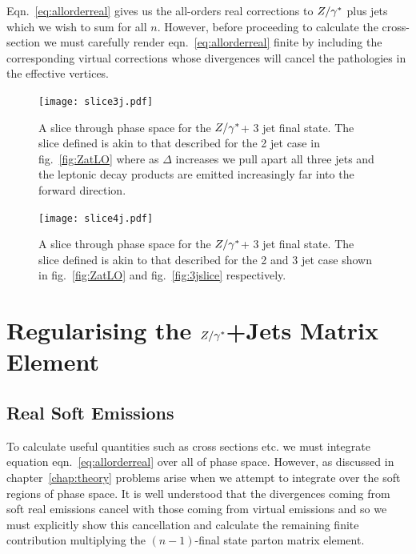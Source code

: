 		Eqn.~\eqref{eq:allorderreal} gives us the all-orders real corrections to $Z/\gamma^*$ plus jets which we wish to sum for all $n$.
		However, before proceeding to calculate the cross-section we must carefully render eqn.~\eqref{eq:allorderreal}
		finite by including the corresponding virtual corrections whose divergences will cancel the pathologies
		in the effective vertices.

		\begin{figure}[hbt]
		  \begin{center}
		    \texttt{[image: slice3j.pdf]}
		    \caption{A slice through phase space for the $Z/\gamma^*$+ 3 jet final state.  The slice defined is
		    akin to that described for the 2 jet case in fig.~\eqref{fig:ZatLO} where as $\Delta$ increases
		    we pull apart all three jets and the leptonic decay products are emitted increasingly far into
		    the forward direction.}
		    \label{fig:3jslice}
		  \end{center}
		\end{figure}

		\begin{figure}[hbt]
		  \begin{center}
		    \texttt{[image: slice4j.pdf]}
		    \caption{A slice through phase space for the $Z/\gamma^*$+ 3 jet final state.  The slice defined is
		    akin to that described for the 2 and 3 jet case shown in fig.~\eqref{fig:ZatLO} and
		    fig.~\eqref{fig:3jslice} respectively.}
		    \label{fig:4jslice}
		  \end{center}
		\end{figure}

\section{Regularising the $Z/\gamma^*$+Jets Matrix Element}
	\label{sec:regularising}

	\subsection{Real Soft Emissions}
		\label{sub:softEmissions}

		To calculate useful quantities such as cross sections etc. we must integrate equation
		eqn.~\eqref{eq:allorderreal} over all of phase space.  However, as discussed in chapter~\ref{chap:theory}
		problems arise when we attempt to integrate over the soft regions of phase space.  It is well understood
		that the divergences coming from soft real emissions cancel with those coming from
		virtual emissions and so we must explicitly show this cancellation and calculate the remaining
		finite contribution multiplying the $(n-1)$-final state parton matrix element.

